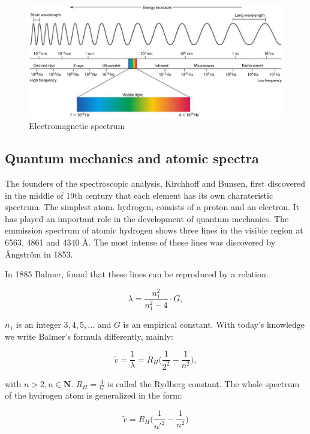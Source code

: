 \documentclass[a4paper,oneside,openright,11pt]{book}
\begin{document}
\begin{figure}[h!]
\centering
\includegraphics[scale=0.3]{DocumentFigures/Figures/EnMSpectrum.jpg}
\caption{Electromagnetic spectrum \cite{spectrum}}
\end{figure}

\subsection{Quantum mechanics and atomic spectra}

The founders of the spectroscopic analysis, Kirchhoff and Bunsen, first discovered in the middle of 19th century that each element has its own charateristic spectrum. The simplest atom. hydrogen, consists of a proton and an electron. It has played an important role in the development of quantum mechanics. The emmission spectrum of atomic hydrogen shows three lines in the visible region at 6563, 4861 and 4340 Å. The most intense of these lines was discovered by Ångström in 1853.

In 1885 Balmer, found that these lines can be reproduced by a relation:

\begin{equation}
    \lambda = \frac{n_{1}^2}{n_{1}^{2} - 4} \cdot G,
\end{equation}

$n_{1}$ is an integer $3, 4, 5, ...$ and $G$ is an empirical constant. With today's knowledge we write Balmer's formula differently, mainly:

\begin{equation}
    \tilde{v} = \frac{1}{\lambda} = R_{H}\Big( \frac{1}{2^{2}} - \frac{1}{n^{2}} \Big),
\end{equation}

with $n > 2, n \in \mathbf{N}$. $R_{H} = \frac{4}{G}$ is called the Rydberg constant. The whole spectrum of the hydrogen atom is generalized in the form:

\begin{equation}
    \tilde{v} =  R_{H}\Big( \frac{1}{n'^{2}} - \frac{1}{n^{2}} \Big)
\end{equation}
\end{document}
